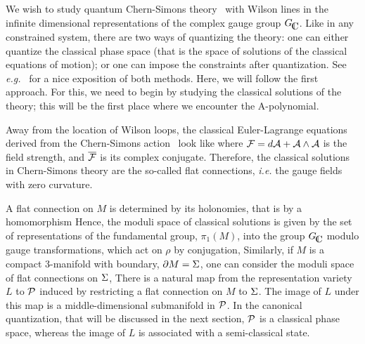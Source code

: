 

We wish to study quantum Chern-Simons theory \iaction\
with Wilson lines in the infinite dimensional
representations of the complex gauge group $\CCG$.
Like in any constrained system,
there are two ways of quantizing the theory:
one can either quantize the classical phase space
(that is the space of solutions of the classical
equations of motion);
or one can impose the constraints after quantization.
See {\it e.g.} \EMSS\ for a nice exposition of both methods.
Here, we will follow the first approach.
For this, we need to begin by studying
the classical solutions of the theory;
this will be the first place where we encounter the A-polynomial.

\subsec{The Moduli Space of Classical Solutions}

Away from the location of Wilson loops,
the classical Euler-Lagrange equations derived from
the Chern-Simons action \iaction\ look like
%
\eqn{}
%
where ${\cal F} = d{\cal A} + {\cal A} \wedge {\cal A}$ is the field strength,
and $\overline {{\cal F}}$ is its complex conjugate. Therefore,
the classical solutions in Chern-Simons theory are the so-called
flat connections, {\it i.e.} the gauge fields with zero curvature.

A flat connection on $M$ is determined
by its holonomies, that is by a homomorphism
%
\eqn{}
%
Hence, the moduli space of classical solutions is given by
the set of representations of the fundamental group, $\pi_1(M)$,
into the group $\CCG$
modulo gauge transformations, which act on $\rho$ by conjugation,
%
\eqn{}
%
Similarly, if $M$ is a compact 3-manifold with boundary, $\partial M = {\Sigma}$,
one can consider the moduli space of flat connections on ${\Sigma}$,
%
\eqn{}
%
There is a natural map from the representation variety $L$ to ${\cal P}$
induced by restricting a flat connection on $M$ to ${\Sigma}$.
The image of $L$ under this map is a middle-dimensional
submanifold in ${\cal P}$.
In the canonical quantization, that will be discussed in the next section,
${\cal P}$ is a classical phase space,
whereas the image of $L$ is associated with a semi-classical state.

\ifig{}
{}

